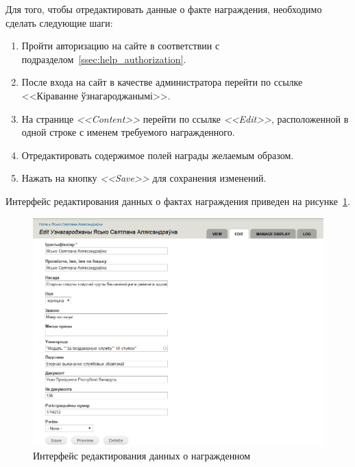 Для того, чтобы отредактировать данные о факте награждения,
необходимо сделать следующие шаги:

\begin{enumerate}
\item Пройти авторизацию на сайте в соответствии с подразделом~\ref{ssec:help_authorization}.
\item После входа на сайт в качестве администратора
   перейти по ссылке <<Кіраванне ўзнагароджанымі>>.
\item На странице \textit{<<Content>>} перейти по ссылке \textit{<<Edit>>},
  расположенной в одной строке с именем требуемого награжденного.
\item Отредактировать содержимое полей награды желаемым образом.
\item Нажать на кнопку \textit{<<Save>>} для сохранения изменений.
\end{enumerate}

Интерфейс редактирования данных о фактах награждения приведен 
на рисунке~\ref{fig:awarded_edit_page}.

\begin{figure}[h]
  \centering
  \includegraphics[width=160mm]{pic/awarded_edit_page.png}
  \caption{Интерфейс редактирования данных о награжденном}
  \label{fig:awarded_edit_page}
\end{figure}
